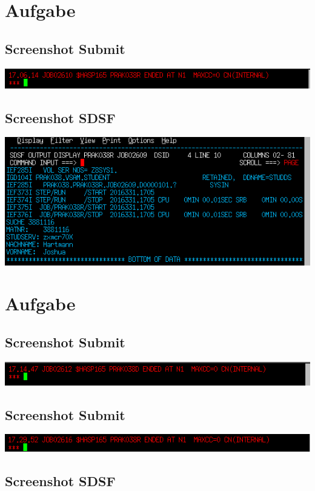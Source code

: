 \documentclass[a4paper]{scrartcl}
\begin{document}
	\section{Aufgabe}
	\subsection{Screenshot Submit}
	\includegraphics{screenshots/3_SUBMIT.png}
	
	\subsection{Screenshot SDSF}
	\includegraphics{screenshots/3_SDSF.png}
	
	
	\section{Aufgabe}
	\subsection{Screenshot Submit}
	\includegraphics{screenshots/4_SUBMIT.png}
	
	\subsection{Screenshot Submit}
	\includegraphics{screenshots/5_SUBMIT.png}
	
	\subsection{Screenshot SDSF}
	
\end{document}
